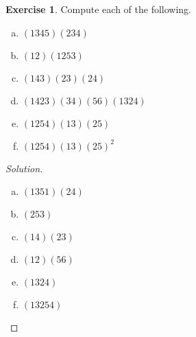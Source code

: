\documentclass{article}
\theoremstyle{definition}
\newtheorem{theorem}{Exercise}[section]
\theoremstyle{remark}
\begin{document}
	\begin{theorem} Compute each of the following.
		\begin{multicols}{3}
		\begin{enumerate}[(a)]
			\item $\left(1345\right)\left(234\right)$
			\item $\left(12\right)\left(1253\right)$
			\item $\left(143\right)(23)(24)$
			\item $(1423)(34)(56)(1324)$
			\item $(1254)(13)(25)$
			\item $(1254)(13)(25)^2$
		\end{enumerate}
		\end{multicols}
	\end{theorem}
	\begin{proof}[Solution]\hfill
		\begin{multicols}{3}
		\begin{enumerate}[(a)]
			\item $(1351)(24)$
			\item $(253)$
			\item $(14)(23)$
			\item $(12)(56)$
			\item $(1324)$
			\item $(13254)$\qedhere
		\end{enumerate}
		\end{multicols}
	\end{proof}
\end{document}
